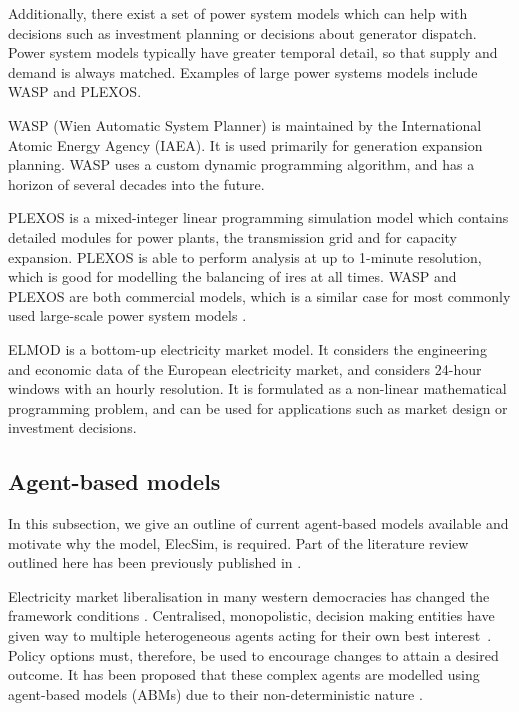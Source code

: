 Additionally, there exist a set of power system models which can help with decisions such as investment planning or decisions about generator dispatch. Power system models typically have greater temporal detail, so that supply and demand is always matched. Examples of large power systems models include WASP and PLEXOS.

WASP (Wien Automatic System Planner) \cite{jenkins1974wein} is maintained by the International Atomic Energy Agency (IAEA). It is used primarily for generation expansion planning. WASP uses a custom dynamic programming algorithm, and has a horizon of several decades into the future. 

PLEXOS is a mixed-integer linear programming simulation model which contains detailed modules for power plants, the transmission grid and for capacity expansion. PLEXOS is able to perform analysis at up to 1-minute resolution, which is good for modelling the balancing of \acrshort{ires} at all times. WASP and PLEXOS are both commercial models, which is a similar case for most commonly used large-scale power system models \cite{Pfenninger2014}.

ELMOD \cite{leuthold2012large} is a bottom-up electricity market model. It considers the engineering and economic data of the European electricity market, and considers 24-hour windows with an hourly resolution. It is formulated as a non-linear mathematical programming problem, and can be used for applications such as market design or investment decisions.


\subsection*{Agent-based models}

In this subsection, we give an outline of current agent-based models available and motivate why the model, ElecSim, is required. Part of the literature review outlined here has been previously published in \cite{Kell}.

Electricity market liberalisation in many western democracies has changed the framework conditions \cite{Praca2003}. Centralised, monopolistic, decision making entities have given way to multiple heterogeneous agents acting for their own best interest~\cite{Most2010}. Policy options must, therefore, be used to encourage changes to attain a desired outcome. It has been proposed that these complex agents are modelled using agent-based models (ABMs) due to their non-deterministic nature \cite{Kell}. 

